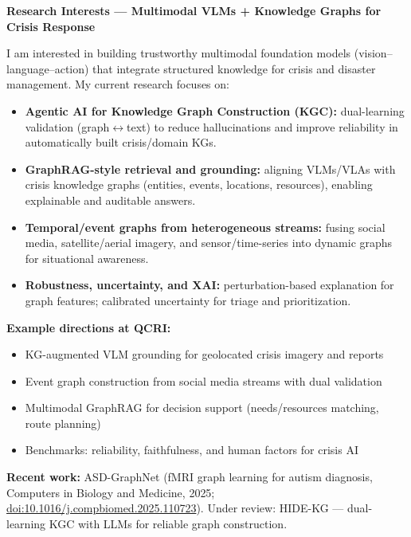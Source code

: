 \documentclass[11pt]{article}
\begin{document}
\noindent\textbf{\Large Research Interests --- Multimodal VLMs + Knowledge Graphs for Crisis Response}

\vspace{0.5em}

I am interested in building trustworthy multimodal foundation models (vision--language--action) that integrate structured knowledge for crisis and disaster management. My current research focuses on:

\begin{itemize}[leftmargin=*]
    \item \textbf{Agentic AI for Knowledge Graph Construction (KGC):} dual-learning validation (graph$\leftrightarrow$text) to reduce hallucinations and improve reliability in automatically built crisis/domain KGs.
    \item \textbf{GraphRAG-style retrieval and grounding:} aligning VLMs/VLAs with crisis knowledge graphs (entities, events, locations, resources), enabling explainable and auditable answers.
    \item \textbf{Temporal/event graphs from heterogeneous streams:} fusing social media, satellite/aerial imagery, and sensor/time-series into dynamic graphs for situational awareness.
    \item \textbf{Robustness, uncertainty, and XAI:} perturbation-based explanation for graph features; calibrated uncertainty for triage and prioritization.
\end{itemize}

\textbf{Example directions at QCRI:}
\begin{itemize}[leftmargin=*]
    \item KG-augmented VLM grounding for geolocated crisis imagery and reports
    \item Event graph construction from social media streams with dual validation
    \item Multimodal GraphRAG for decision support (needs/resources matching, route planning)
    \item Benchmarks: reliability, faithfulness, and human factors for crisis AI
\end{itemize}

\textbf{Recent work:} ASD-GraphNet (fMRI graph learning for autism diagnosis, Computers in Biology and Medicine, 2025; \href{https://doi.org/10.1016/j.compbiomed.2025.110723}{doi:10.1016/j.compbiomed.2025.110723}). Under review: HIDE-KG --- dual-learning KGC with LLMs for reliable graph construction.
\end{document}

